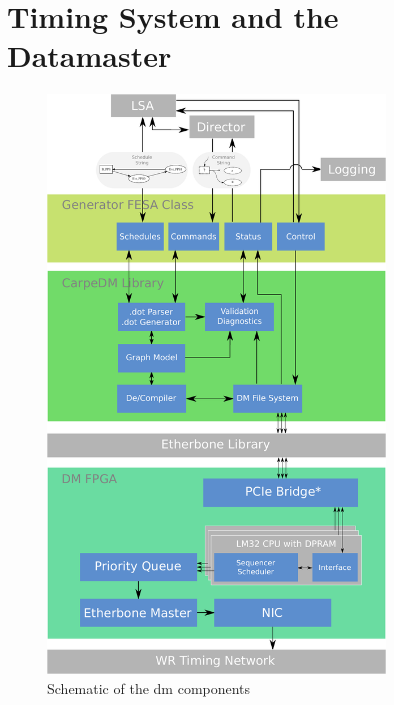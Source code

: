 \section{Timing System and the Datamaster}
\begin{figure}[H]
   \centering
   \includegraphics*[width=0.8\textwidth,keepaspectratio]{Figures/stack}
   \caption{Schematic of the \gls{dm} components}
   \label{fig:stack}
\end{figure}
%
